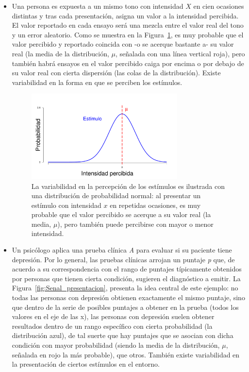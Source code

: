 \begin{itemize}
\item Una persona es expuesta a un mismo tono con intensidad $X$ en cien ocasiones distintas y tras cada presentación, asigna un valor a la intensidad percibida. El valor reportado en cada ensayo será una mezcla entre el valor real del tono y un error aleatorio. Como se muestra en la Figura~\ref{fig:Senal_percepcion}, es muy probable que el valor percibido y reportado coincida con -o se acerque bastante a- su valor real (la media de la distribución, $\mu$, señalada con una línea vertical roja), pero también habrá ensayos en el valor percibido caiga por encima o por debajo de su valor real con cierta dispersión (las colas de la distribución). Existe variabilidad en la forma en que se perciben los estímulos.

\begin{figure}[h]
\centering
\includegraphics[width=0.75\textwidth]{Figures/Signal_Perception} 
\decoRule
\caption[Variabilidad en la percepción de los estímulos]{La variabilidad en la percepción de los estímulos es ilustrada con una distribución de probabilidad normal: al presentar un estímulo con intensidad $x$ en repetidas ocasiones, es muy probable que el valor percibido se acerque a su valor real (la media, $\mu$), pero también puede percibirse con mayor o menor intensidad.}
\label{fig:Senal_percepcion}
\end{figure}

\item Un psicólogo aplica una prueba clínica \textit{A} para evaluar si su paciente tiene depresión. Por lo general, las pruebas clínicas arrojan un puntaje \textit{p} que, de acuerdo a su correspondencia con el rango de puntajes típicamente obtenidos por personas que tienen cierta condición, sugieren el diagnóstico a emitir. La Figura~\ref{fig:Senal_presentacion}, presenta la idea central de este ejemplo: no todas las personas con depresión obtienen exactamente el mismo puntaje, sino que dentro de la serie de posibles puntajes a obtener en la prueba (todos los valores en el eje de las x), las personas con depresión suelen obtener resultados dentro de un rango específico con cierta probabilidad (la distribución azul), de tal suerte que hay puntajes que se asocian con dicha condición con mayor probabilidad (siendo la media de la distribución, $\mu$, señalada en rojo la más probable), que otros. También existe variabilidad en la presentación de ciertos estímulos en el entorno.\\
\end{itemize}

